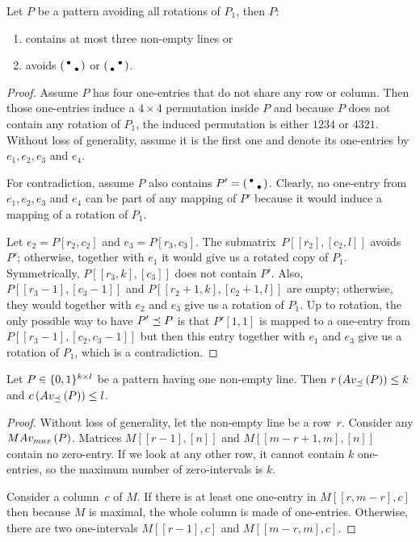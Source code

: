 \begin{thm}
\label{thm:boundedints}
Let $P$ be a pattern avoiding all rotations of $P_1$, then $P$:
\begin{enumerate}
	\item contains at most three non-empty lines or
	\item avoids $\left(\begin{smallmatrix}\bullet& \\ &\bullet\end{smallmatrix}\right)$ or $\left(\begin{smallmatrix} &\bullet\\\bullet& \end{smallmatrix}\right)$.
\end{enumerate}
\end{thm}
\begin{proof}
Assume $P$ has four one-entries that do not share any row or column. Then those one-entries induce a $4\times4$ permutation inside $P$ and because $P$ does not contain any rotation of $P_1$, the induced permutation is either $1234$ or $4321$. Without loss of generality, assume it is the first one and denote its one-entries by $e_1,e_2,e_3$ and $e_4$.

For contradiction, assume $P$ also contains $P'=\left(\begin{smallmatrix}\bullet& \\ &\bullet\end{smallmatrix}\right)$. Clearly, no one-entry from $e_1,e_2,e_3$ and $e_4$ can be part of any mapping of $P'$ because it would induce a mapping of a rotation of $P_1$.

Let $e_2=P[r_2,c_2]$ and $e_3=P[r_3,c_3]$. The submatrix~$P[[r_2],[c_2,l]]$ avoids $P'$; otherwise, together with $e_1$ it would give us a rotated copy of $P_1$. Symmetrically, $P[[r_3,k],[c_3]]$ does not contain $P'$. Also, $P[[r_3-1],[c_3-1]]$ and $P[[r_2+1,k],[c_2+1,l]]$ are empty; otherwise, they would together with $e_2$ and $e_3$ give us a rotation of $P_1$. Up to rotation, the only possible way to have $P'\preceq P$ is that $P'[1,1]$ is mapped to a one-entry from $P[[r_3-1],[c_2,c_3-1]]$ but then this entry together with $e_1$ and $e_3$ give us a rotation of $P_1$, which is a contradiction.
\end{proof}

\begin{lemma}
Let $P\in\{0,1\}^{k\times l}$ be a pattern having one non-empty line. Then $r\left(Av_{\preceq}\left(P\right)\right)\leq k$ and $c\left(Av_{\preceq}\left(P\right)\right)\leq l$.
\end{lemma}
\begin{proof}
Without loss of generality, let the non-empty line be a row~$r$. Consider any $MAv_{max}\left(P\right)$. Matrices $M[[r-1],[n]]$ and $M[[m-r+1,m],[n]]$ contain no zero-entry. If we look at any other row, it cannot contain $k$ one-entries, so the maximum number of zero-intervals is $k$.

Consider a column~$c$ of $M$. If there is at least one one-entry in $M[[r,m-r],c]$ then because $M$ is maximal, the whole column is made of one-entries. Otherwise, there are two one-intervals $M[[r-1],c]$ and $M[[m-r,m],c]$.
\end{proof}

